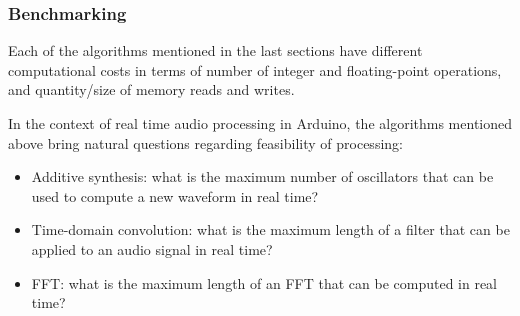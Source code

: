 \subsubsection{Benchmarking}

Each of the algorithms mentioned in the last sections have different
computational costs in terms of number of integer and floating-point
operations, and quantity/size of memory reads and writes. 

In the context of real time audio processing in Arduino, the algorithms mentioned above
bring natural questions regarding feasibility of processing:

\begin{itemize}
  \item Additive synthesis: what is the maximum number of oscillators that can
  be used to compute a new waveform in real time?
  \item Time-domain convolution: what is the maximum length of a filter that
  can be applied to an audio signal in real time?
  \item FFT: what is the maximum length of an FFT that can be computed in real time?
\end{itemize}

